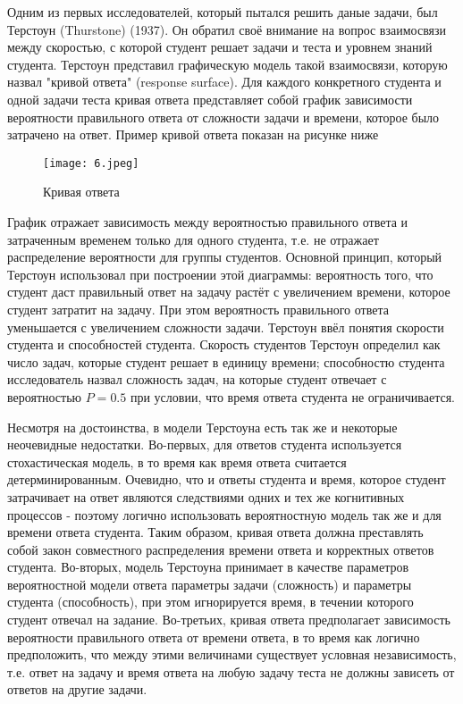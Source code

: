  Одним из первых исследователей, который пытался решить даные за\-дачи, был Терстоун (Thurstone) (1937). Он обратил своё внимание на воп\-рос взаимосвязи между скоростью, с которой студент решает задачи и теста и уровнем знаний студента. Терстоун представил графическую модель такой взаимосвязи, которую назвал "кривой ответа" (response surface). Для каждого конкретного студента и одной задачи теста кривая ответа представляет собой график зависимости вероятности правиль\-ного ответа от сложности задачи и времени, которое было затрачено на ответ. Пример кривой ответа показан на рисунке ниже

\begin{figure}[ht!] 
\centering \texttt{[image: 6.jpeg]} 
\caption{Кривая ответа} 
\end{figure}

График отражает зависимость между вероятностью правильного ответа и затраченным временем только для одного студента, т.е. не отражает распре\-деление вероятности для группы студентов. Основной принцип, который Тер\-стоун использовал при построении этой диаграммы: вероятность того, что студент даст правильный ответ на задачу растёт с увеличением времени, которое студент затратит на задачу. При этом вероятность правиль\-ного ответа уменьшается с увеличением сложности задачи. Терстоун ввёл понятия ско\-рости студента и способностей студента. Скорость студентов Терстоун опре\-делил как число задач, которые студент решает в единицу времени; способ\-ностю студента исследо\-ватель назвал сложность задач, на которые студент отвечает с вероятностью $P=0.5$ при условии, что время ответа студента не ограничи\-вается.

Несмотря на достоинства, в модели Терстоуна есть так же и некоторые неочевидные недостатки. Во-первых, для ответов студента используется сто\-хастическая модель, в то время как время ответа считается детерминирован\-ным. Очевидно, что и ответы студента и время, которое студент затрачивает на ответ являются следствиями одних и тех же когнитивных процессов - поэтому логично использовать вероятностную модель так же и для времени ответа студента. Таким образом, кривая ответа должна преставлять собой закон совместного распределения времени ответа и корректных ответов сту\-дента. Во-вторых, модель Терстоуна принимает в качестве параметров веро\-ятностной модели ответа парамет\-ры задачи (сложность) и параметры сту\-дента (способность), при этом игнорируется время, в течении которого студент отвечал на задание. Во-третьих, кривая ответа предпола\-гает зависимость ве\-роятности правильного ответа от времени ответа, в то время как логично предположить, что между этими величинами существует условная незави\-симость, т.е. ответ на задачу и время ответа на любую задачу теста не должны зависеть от ответов на другие задачи. 

